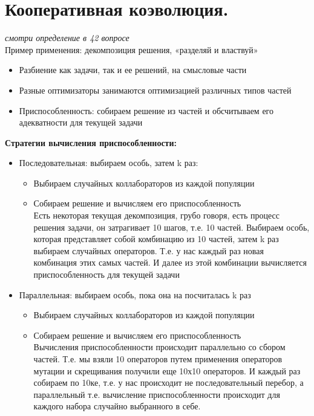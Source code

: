 \section{Кооперативная коэволюция.}
\textit{смотри определение в 42 вопросе}\\
Пример применения: декомпозиция решения, «разделяй и властвуй»
\begin{itemize}
    \item Разбиение как задачи, так и ее решений, на смысловые части
    \item Разные оптимизаторы занимаются оптимизацией различных типов частей
    \item Приспособленность: собираем решение из частей и обсчитываем его адекватности для текущей задачи
\end{itemize}

\textbf{Стратегии вычисления приспособленности:}
\begin{itemize}
    \item Последовательная: выбираем особь, затем k раз:
    \begin{itemize}
        \item Выбираем случайных коллабораторов из каждой популяции
        \item Собираем решение и вычисляем его приспособленность\\
        Есть некоторая текущая декомпозиция, грубо говоря, есть процесс решения задачи, он затрагивает 10 шагов, т.е. 10 частей. Выбираем особь, которая представляет собой комбинацию из 10 частей, затем k раз выбираем случайных операторов. Т.е. у нас каждый раз новая комбинация этих самых частей. И далее из этой комбинации вычисляется приспособленность для текущей задачи 
    \end{itemize}
    \item Параллельная: выбираем особь, пока она на посчиталась k раз
    \begin{itemize}
        \item Выбираем случайных коллабораторов из каждой популяции
        \item Собираем решение и вычисляем его приспособленность\\
        Вычисления приспособленности происходит параллельно со сбором частей. Т.е. мы взяли 10 операторов путем применения операторов мутации и скрещивания получили еще 10х10 операторов. И каждый раз собираем по 10ке, т.е. у нас происходит не последовательный перебор, а параллельный т.е. вычисление приспособленности происходит для каждого набора случайно выбранного в себе.
    \end{itemize}
\end{itemize}
